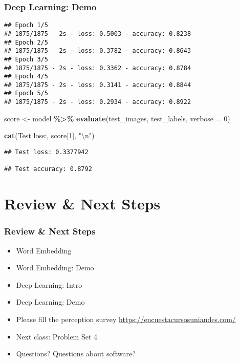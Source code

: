 \documentclass[
  shownotes,
  xcolor={svgnames},
  hyperref={colorlinks,citecolor=DarkBlue,linkcolor=DarkRed,urlcolor=DarkBlue}
  , aspectratio=169]{beamer}
\newenvironment{Shaded}{\begin{snugshade}}{\end{snugshade}}
\newcommand{\CharTok}[1]{\textcolor[rgb]{0.31,0.60,0.02}{#1}}
\newcommand{\DataTypeTok}[1]{\textcolor[rgb]{0.13,0.29,0.53}{#1}}
\newcommand{\DecValTok}[1]{\textcolor[rgb]{0.00,0.00,0.81}{#1}}
\newcommand{\KeywordTok}[1]{\textcolor[rgb]{0.13,0.29,0.53}{\textbf{#1}}}
\newcommand{\NormalTok}[1]{#1}
\newcommand{\OperatorTok}[1]{\textcolor[rgb]{0.81,0.36,0.00}{\textbf{#1}}}
\newcommand{\StringTok}[1]{\textcolor[rgb]{0.31,0.60,0.02}{#1}}
\begin{document}
\begin{frame}[fragile]
\frametitle{Deep Learning: Demo}
\begin{scriptsize}
\begin{verbatim}
## Epoch 1/5
## 1875/1875 - 2s - loss: 0.5003 - accuracy: 0.8238
## Epoch 2/5
## 1875/1875 - 2s - loss: 0.3782 - accuracy: 0.8643
## Epoch 3/5
## 1875/1875 - 2s - loss: 0.3362 - accuracy: 0.8784
## Epoch 4/5
## 1875/1875 - 2s - loss: 0.3141 - accuracy: 0.8844
## Epoch 5/5
## 1875/1875 - 2s - loss: 0.2934 - accuracy: 0.8922
\end{verbatim}
\end{scriptsize}

\begin{Shaded}
\begin{Highlighting}[]
\NormalTok{score \textless{}{-}}\StringTok{ }\NormalTok{model }\OperatorTok{\%\textgreater{}\%}\StringTok{ }\KeywordTok{evaluate}\NormalTok{(test\_images, test\_labels, }\DataTypeTok{verbose =} \DecValTok{0}\NormalTok{)}

\KeywordTok{cat}\NormalTok{(}\StringTok{\textquotesingle{}Test loss:\textquotesingle{}}\NormalTok{, score[}\DecValTok{1}\NormalTok{], }\StringTok{"}\CharTok{\textbackslash{}n}\StringTok{"}\NormalTok{)}
\end{Highlighting}
\end{Shaded}
\begin{scriptsize}

\begin{verbatim}
## Test loss: 0.3377942

## Test accuracy: 0.8792
\end{verbatim}
\end{scriptsize}
\end{frame}

\section{Review
 \& Next Steps}
\begin{frame}
\frametitle{Review \& Next Steps}
  
\begin{itemize} 
  
\item  Word Embedding
\item  Word Embedding: Demo
\item  Deep Learning: Intro
\item  Deep Learning: Demo
\bigskip
\item Please fill the perception survey \url{https://encuestacursosuniandes.com/}
    \bigskip  
  \item  Next class:  Problem Set 4


\bigskip  
\item Questions? Questions about software? 

\end{itemize}
\end{frame}
\end{document}
